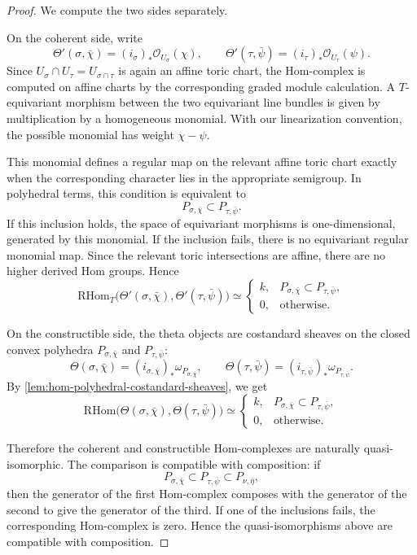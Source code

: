 \begin{proof}
We compute the two sides separately.

On the coherent side, write
\[
\Theta'(\sigma,\bar\chi)=(i_\sigma)_*\mathcal O_{U_\sigma}(\chi),
\qquad
\Theta'(\tau,\bar\psi)=(i_\tau)_*\mathcal O_{U_\tau}(\psi).
\]
Since \(U_\sigma\cap U_\tau=U_{\sigma\cap\tau}\) is again an affine toric
chart, the Hom-complex is computed on affine charts by the corresponding
graded module calculation. A \(T\)-equivariant morphism between the two
equivariant line bundles is given by multiplication by a homogeneous monomial.
With our linearization convention, the possible monomial has weight
\(\chi-\psi\).

This monomial defines a regular map on the relevant affine toric chart exactly
when the corresponding character lies in the appropriate semigroup. In
polyhedral terms, this condition is equivalent to
\[
P_{\sigma,\bar\chi}\subset P_{\tau,\bar\psi}.
\]
If this inclusion holds, the space of equivariant morphisms is one-dimensional,
generated by this monomial. If the inclusion fails, there is no equivariant
regular monomial map. Since the relevant toric intersections are affine, there
are no higher derived Hom groups. Hence
\[
\mathrm{RHom}_T\bigl(\Theta'(\sigma,\bar\chi),
\Theta'(\tau,\bar\psi)\bigr)
\simeq
\begin{cases}
k, & P_{\sigma,\bar\chi}\subset P_{\tau,\bar\psi},\\
0, & \text{otherwise}.
\end{cases}
\]

On the constructible side, the theta objects are costandard sheaves on the
closed convex polyhedra \(P_{\sigma,\bar\chi}\) and \(P_{\tau,\bar\psi}\):
\[
\Theta(\sigma,\bar\chi)
=
(i_{\sigma,\bar\chi})_*\omega_{P_{\sigma,\bar\chi}},
\qquad
\Theta(\tau,\bar\psi)
=
(i_{\tau,\bar\psi})_*\omega_{P_{\tau,\bar\psi}}.
\]
By \cref{lem:hom-polyhedral-costandard-sheaves}, we get
\[
\mathrm{RHom}\bigl(\Theta(\sigma,\bar\chi),
\Theta(\tau,\bar\psi)\bigr)
\simeq
\begin{cases}
k, & P_{\sigma,\bar\chi}\subset P_{\tau,\bar\psi},\\
0, & \text{otherwise}.
\end{cases}
\]

Therefore the coherent and constructible Hom-complexes are naturally
quasi-isomorphic. The comparison is compatible with composition: if
\[
P_{\sigma,\bar\chi}\subset P_{\tau,\bar\psi}
\subset P_{\nu,\bar\eta},
\]
then the generator of the first Hom-complex composes with the generator of the
second to give the generator of the third. If one of the inclusions fails, the
corresponding Hom-complex is zero. Hence the quasi-isomorphisms above are
compatible with composition.
\end{proof}



